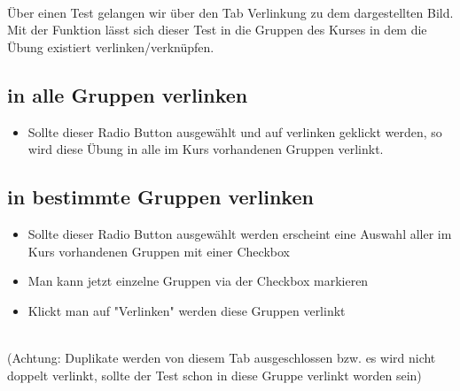 ~\\Über einen Test gelangen wir über den Tab Verlinkung zu dem dargestellten Bild. 
Mit der Funktion lässt sich dieser Test in die Gruppen des Kurses in dem die Übung existiert verlinken/verknüpfen. 

\newpage

\subsection*{in alle Gruppen verlinken}
\begin{itemize}
	\item Sollte dieser Radio Button ausgewählt und auf verlinken geklickt werden, so wird diese Übung in alle im Kurs vorhandenen Gruppen verlinkt. 
\end{itemize}

\subsection*{in bestimmte Gruppen verlinken}
\begin{itemize}
	\item Sollte dieser Radio Button ausgewählt werden erscheint eine Auswahl aller im Kurs vorhandenen Gruppen mit einer Checkbox
	\item Man kann jetzt einzelne Gruppen via der Checkbox markieren
	\item Klickt man auf "Verlinken" werden diese Gruppen verlinkt
\end{itemize}

~\\(Achtung: Duplikate werden von diesem Tab ausgeschlossen bzw. es wird nicht doppelt verlinkt, sollte der Test schon in diese Gruppe verlinkt worden sein) 
\clearpage